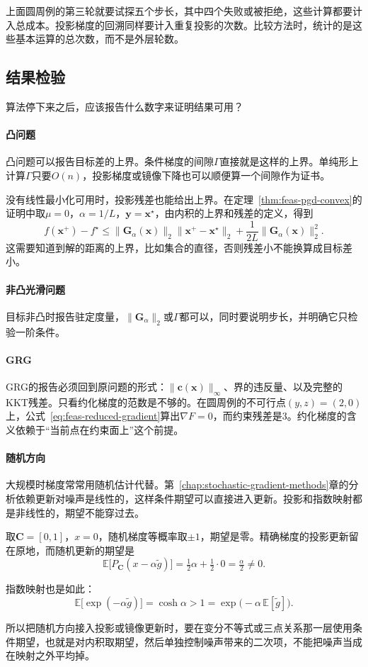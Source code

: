 上面圆周例的第三轮就要试探五个步长，其中四个失败或被拒绝，这些计算都要计入总成本。投影梯度的回溯同样要计入重复投影的次数。比较方法时，统计的是这些基本运算的总次数，而不是外层轮数。

\subsection{结果检验}
\label{sec:feas-compare-check}

算法停下来之后，应该报告什么数字来证明结果可用？

\paragraph{凸问题}
凸问题可以报告目标差的上界。条件梯度的间隙$\Gamma$直接就是这样的上界。单纯形上计算$\Gamma$只要$O(n)$，投影梯度或镜像下降也可以顺便算一个间隙作为证书。

没有线性最小化可用时，投影残差也能给出上界。在定理~\ref{thm:feas-pgd-convex}的证明中取$\mu=0$，$\alpha=1/L$，$\bm{y}=\bm{x}^\star$，由内积的上界和残差的定义，得到
\begin{equation}
 f(\bm{x}^{+})-f^\star\leq\lVert\bm{G}_\alpha(\bm{x})\rVert_2\lVert\bm{x}^{+}-\bm{x}^\star\rVert_2+\frac{1}{2L}\lVert\bm{G}_\alpha(\bm{x})\rVert_2^2.
 \label{eq:feas-residual-gap}
\end{equation}
这需要知道到解的距离的上界，比如集合的直径，否则残差小不能换算成目标差小。

\paragraph{非凸光滑问题}
目标非凸时报告驻定度量，$\lVert\bm{G}_\alpha\rVert_2$或$\Gamma$都可以，同时要说明步长，并明确它只检验一阶条件。

\paragraph{GRG}
GRG的报告必须回到原问题的形式：$\lVert\bm{c}(\bm{x})\rVert_\infty$、界的违反量、以及完整的KKT残差。只看约化梯度的范数是不够的。在圆周例的不可行点$(y,z)=(2,0)$上，公式~\eqref{eq:feas-reduced-gradient}算出$\nabla F=0$，而约束残差是$3$。约化梯度的含义依赖于“当前点在约束面上”这个前提。

\paragraph{随机方向}
大规模时梯度常常用随机估计代替。第~\ref{chap:stochastic-gradient-methods}章的分析依赖更新对噪声是线性的，这样条件期望可以直接进入更新。投影和指数映射都是非线性的，期望不能穿过去。

取$\bm{C}=[0,1]$，$x=0$，随机梯度等概率取$\pm1$，期望是零。精确梯度的投影更新留在原地，而随机更新的期望是
\[
 \mathbb{E}\bigl[P_{\bm{C}}(x-\alpha\tilde g)\bigr]=\tfrac12\alpha+\tfrac12\cdot0=\tfrac\alpha2\neq0.
\]

指数映射也是如此：
\[
 \mathbb{E}\bigl[\exp(-\alpha\tilde g)\bigr]=\cosh\alpha>1=\exp\bigl(-\alpha\,\mathbb{E}[\tilde g]\bigr).
\]

所以把随机方向接入投影或镜像更新时，要在变分不等式或三点关系那一层使用条件期望，也就是对内积取期望，然后单独控制噪声带来的二次项，不能把噪声当成在映射之外平均掉。
